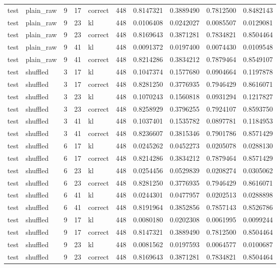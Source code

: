 \begin{tabular}{llrrlrrrrr}
test & plain_raw & 9 & 17 & correct & 448 & 0.8147321 & 0.3889490 & 0.7812500 & 0.8482143 \\
test & plain_raw & 9 & 23 & kl & 448 & 0.0106408 & 0.0242027 & 0.0085507 & 0.0129081 \\
test & plain_raw & 9 & 23 & correct & 448 & 0.8169643 & 0.3871281 & 0.7834821 & 0.8504464 \\
test & plain_raw & 9 & 41 & kl & 448 & 0.0091372 & 0.0197400 & 0.0074430 & 0.0109548 \\
test & plain_raw & 9 & 41 & correct & 448 & 0.8214286 & 0.3834212 & 0.7879464 & 0.8549107 \\
test & shuffled & 3 & 17 & kl & 448 & 0.1047374 & 0.1577680 & 0.0904664 & 0.1197878 \\
test & shuffled & 3 & 17 & correct & 448 & 0.8281250 & 0.3776935 & 0.7946429 & 0.8616071 \\
test & shuffled & 3 & 23 & kl & 448 & 0.1070243 & 0.1560818 & 0.0931294 & 0.1217827 \\
test & shuffled & 3 & 23 & correct & 448 & 0.8258929 & 0.3796255 & 0.7924107 & 0.8593750 \\
test & shuffled & 3 & 41 & kl & 448 & 0.1037401 & 0.1535782 & 0.0897781 & 0.1184953 \\
test & shuffled & 3 & 41 & correct & 448 & 0.8236607 & 0.3815346 & 0.7901786 & 0.8571429 \\
test & shuffled & 6 & 17 & kl & 448 & 0.0245262 & 0.0452273 & 0.0205078 & 0.0288130 \\
test & shuffled & 6 & 17 & correct & 448 & 0.8214286 & 0.3834212 & 0.7879464 & 0.8571429 \\
test & shuffled & 6 & 23 & kl & 448 & 0.0254456 & 0.0529839 & 0.0208274 & 0.0305062 \\
test & shuffled & 6 & 23 & correct & 448 & 0.8281250 & 0.3776935 & 0.7946429 & 0.8616071 \\
test & shuffled & 6 & 41 & kl & 448 & 0.0244301 & 0.0477957 & 0.0202513 & 0.0288898 \\
test & shuffled & 6 & 41 & correct & 448 & 0.8191964 & 0.3852856 & 0.7857143 & 0.8526786 \\
test & shuffled & 9 & 17 & kl & 448 & 0.0080180 & 0.0202308 & 0.0061995 & 0.0099244 \\
test & shuffled & 9 & 17 & correct & 448 & 0.8147321 & 0.3889490 & 0.7812500 & 0.8504464 \\
test & shuffled & 9 & 23 & kl & 448 & 0.0081562 & 0.0197593 & 0.0064577 & 0.0100687 \\
test & shuffled & 9 & 23 & correct & 448 & 0.8169643 & 0.3871281 & 0.7834821 & 0.8504464 \\

\end{tabular}
